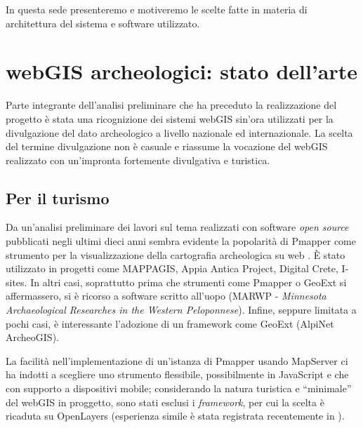 \documentclass{paper}
\begin{document}
        In questa sede presenteremo e motiveremo le scelte fatte in materia di architettura del sistema e software utilizzato.

\section{webGIS archeologici: stato dell'arte}

    Parte integrante dell'analisi preliminare che ha preceduto la realizzazione del progetto è stata una ricognizione dei sistemi webGIS sin'ora utilizzati per la divulgazione del dato archeologico a livello nazionale ed internazionale. La scelta del termine divulgazione non è casuale e riassume la vocazione del webGIS realizzato con un'impronta fortemente divulgativa e turistica.

    \subsection{Per il turismo}

        Da un'analisi preliminare dei lavori sul tema realizzati con software \textit{open source} pubblicati negli ultimi dieci anni \cite{gis-applications,hierapolis,webmapping-etruscan} sembra evidente la popolarità di Pmapper come strumento per la visualizzazione della cartografia archeologica su web \cite{itanos,landlab-archeo}. È stato utilizzato in progetti come MAPPAGIS, Appia Antica Project, Digital Crete, I-sites. In altri casi, soprattutto prima che strumenti come Pmapper o GeoExt si affermassero, si è ricorso a software scritto all'uopo (MARWP - \textit{Minnesota Archaeological Researches in the Western Peloponnese}). Infine, seppure limitata a pochi casi, è interessante l'adozione di un framework come GeoExt (AlpiNet ArcheoGIS).

        La facilità nell'implementazione di un'istanza di Pmapper usando MapServer ci ha indotti a scegliere uno strumento flessibile, possibilmente in JavaScript e che con supporto a dispositivi mobile; considerando la natura turistica e ``minimale'' del webGIS in proggetto, sono stati esclusi i \textit{framework}, per cui la scelta è ricaduta su OpenLayers (esperienza simile è stata registrata recentemente in \cite{vervassium}).
\end{document}
